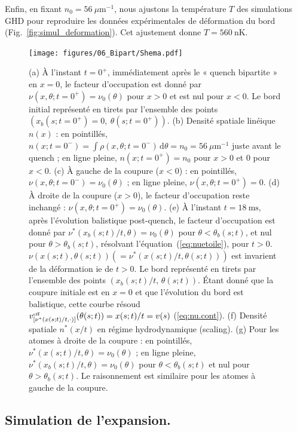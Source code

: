 \medskip 

Enfin, en fixant \(n_0 = 56~\mu\mathrm{m}^{-1}\), nous ajustons la température \(T\) des simulations GHD pour reproduire les données expérimentales de déformation du bord (Fig.~\ref{fig:simul_deformation}). Cet ajustement donne \(T = 560~\mathrm{nK}\).

\begin{figure}[!htb]
	\centering
	\texttt{[image: figures/06\_Bipart/Shema.pdf]}
	\caption{
(a) À l'instant $t = 0^+$, immédiatement après le « quench bipartite » en $x = 0$, le facteur d'occupation est donné par $\nu(x, \theta ; t = 0^+) = \nu_0(\theta)$ pour $x > 0$ et est nul pour $x < 0$. Le bord initial représenté en tirets par l'ensemble des points $(x_b(s; t = 0^+) = 0,\ \theta(s; t = 0^+))$.
(b) Densité spatiale linéique $n(x)$ : en pointillés, $n(x; t = 0^-) = \int \rho(x, \theta; t = 0^-) \, \mathrm{d}\theta = n_0 = 56~\mu\mathrm{m}^{-1}$ juste avant le quench ; en ligne pleine, $n(x; t = 0^+) = n_0$ pour $x > 0$ et $0$ pour $x < 0$.
(c) À gauche de la coupure ($x < 0$) : en pointillés, $\nu(x, \theta ; t = 0^-) = \nu_0(\theta)$ ; en ligne pleine, $\nu(x, \theta ; t = 0^+) = 0$.
(d) À droite de la coupure ($x > 0$), le facteur d'occupation reste inchangé : $\nu(x, \theta ; t = 0^+) = \nu_0(\theta)$.
(e) À l'instant $t = 18~\mathrm{ms}$, après l'évolution balistique post-quench, le facteur d'occupation est donné par $\nu^\ast(x_b(s;t)/t, \theta) = \nu_0(\theta)$ pour $\theta < \theta_b(s;t)$, et nul pour $\theta > \theta_b(s;t)$, résolvant l'équation~(\ref{eq:nuetoile}), pour $t>0$. $\nu(x(s;t), \theta(s;t))(=\nu^\ast(x(s;t)/t, \theta(s;t)))$ est invarient de la déformation ie de $t>0$.  Le bord représenté en tirets par l'ensemble des points $(x_b(s; t)/t,\, \theta(s; t))$. Étant donné que la coupure initiale est en $x = 0$ et que l’évolution du bord est balistique, cette courbe résoud $v^{\mbox{\tiny eff}}_{[\nu^\ast(x(s; t)/t, \cdot) ]}(\theta(s; t)) = x(s; t)/t = v(s)$ (\ref{eq:nu.cont}).
(f) Densité spatiale  $n^\ast(x/t)$ en régime hydrodynamique (scaling).
(g) Pour les atomes à droite de la coupure : en pointillés, $\nu^\ast(x(s;t)/t, \theta) = \nu_0(\theta)$ ; en ligne pleine, $\nu^\ast(x_b(s;t)/t, \theta) = \nu_0(\theta)$ pour $\theta < \theta_b(s;t)$ et nul pour $\theta > \theta_b(s;t)$. Le raisonnement est similaire pour les atomes à gauche de la coupure.
}
	\label{fig:BiPart.coupure1}
	
\end{figure}

\subsection{Simulation de l’expansion.}

